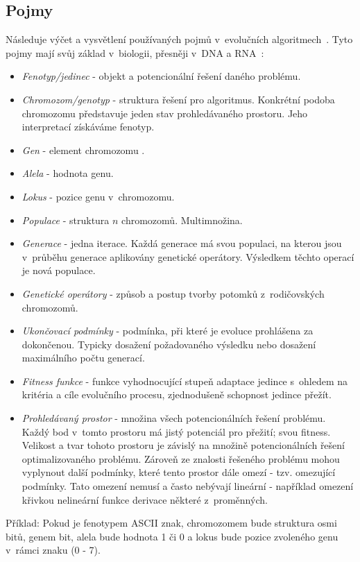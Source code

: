 \subsection*{Pojmy}
Následuje výčet a vysvětlení používaných pojmů v~evolučních algoritmech~\cite{EVO}. Tyto pojmy mají svůj základ v~biologii, přesněji v~DNA a RNA~\cite{EA_OVERVIEW}:
\begin{itemize}
    \item \textit{Fenotyp/jedinec} - objekt a potencionální řešení daného problému.
    \item \textit{Chromozom/genotyp} - struktura řešení pro algoritmus. Konkrétní podoba chromozomu představuje jeden stav prohledávaného prostoru. Jeho interpretací získáváme fenotyp.
    \item \textit{Gen} - element chromozomu .
    \item \textit{Alela} - hodnota genu.
    \item \textit{Lokus} - pozice genu v~chromozomu.
    \item \textit{Populace} - struktura $n$ chromozomů. Multimnožina.
    \item \textit{Generace} - jedna iterace. Každá generace má svou populaci, na kterou jsou v~průběhu generace aplikovány genetické operátory. Výsledkem těchto operací je nová populace.
    \item \textit{Genetické operátory} - způsob a postup tvorby potomků z~rodičovských chromozomů.
    \item \textit{Ukončovací podmínky} - podmínka, při které je evoluce prohlášena za dokončenou. Typicky dosažení požadovaného výsledku nebo dosažení maximálního počtu generací.
    \item \textit{Fitness funkce} - funkce vyhodnocující  stupeň adaptace jedince s~ohledem na kritéria a cíle evolučního procesu, zjednodušeně schopnost jedince přežít.
    \item \textit{Prohledávaný prostor} - množina všech potencionálních řešení problému. Každý bod v~tomto prostoru má jistý potenciál pro přežití; svou fitness. Velikost a tvar tohoto prostoru je závislý na množině potencionálních řešení optimalizovaného problému. Zároveň ze znalosti řešeného problému mohou vyplynout další podmínky, které tento prostor dále omezí - tzv. omezující podmínky. Tato omezení nemusí a často nebývají lineární - například omezení křivkou nelineární funkce derivace některé z~proměnných.
\end{itemize}

Příklad: Pokud je fenotypem ASCII znak, chromozomem bude struktura osmi bitů, genem bit, alela bude hodnota 1 či 0 a lokus bude pozice zvoleného genu v~rámci znaku (0 - 7).

